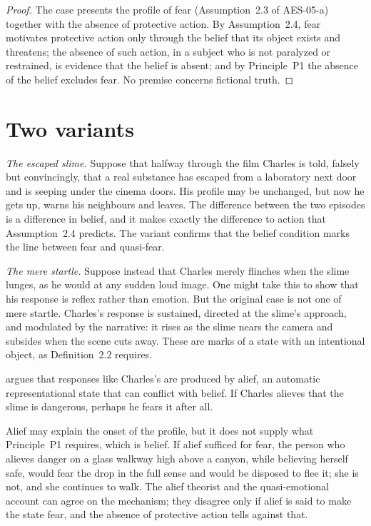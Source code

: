 \documentclass{situationist-preprint}
\begin{document}
\begin{proof}
The case presents the profile of fear (Assumption~2.3 of AES-05-a) together with the absence of protective action. By Assumption~2.4, fear motivates protective action only through the belief that its object exists and threatens; the absence of such action, in a subject who is not paralyzed or restrained, is evidence that the belief is absent; and by Principle~P1 the absence of the belief excludes fear. No premise concerns fictional truth.
\end{proof}

\section{Two variants}

\emph{The escaped slime.} Suppose that halfway through the film Charles is told, falsely but convincingly, that a real substance has escaped from a laboratory next door and is seeping under the cinema doors. His profile may be unchanged, but now he gets up, warns his neighbours and leaves. The difference between the two episodes is a difference in belief, and it makes exactly the difference to action that Assumption~2.4 predicts. The variant confirms that the belief condition marks the line between fear and quasi-fear.

\emph{The mere startle.} Suppose instead that Charles merely flinches when the slime lunges, as he would at any sudden loud image. One might take this to show that his response is reflex rather than emotion. But the original case is not one of mere startle. Charles's response is sustained, directed at the slime's approach, and modulated by the narrative: it rises as the slime nears the camera and subsides when the scene cuts away. These are marks of a state with an intentional object, as Definition~2.2 requires.

\begin{objection}[Alief]
\citet{Gendler2008} argues that responses like Charles's are produced by alief, an automatic representational state that can conflict with belief. If Charles alieves that the slime is dangerous, perhaps he fears it after all.
\end{objection}

\begin{reply}
Alief may explain the onset of the profile, but it does not supply what Principle~P1 requires, which is belief. If alief sufficed for fear, the person who alieves danger on a glass walkway high above a canyon, while believing herself safe, would fear the drop in the full sense and would be disposed to flee it; she is not, and she continues to walk. The alief theorist and the quasi-emotional account can agree on the mechanism; they disagree only if alief is said to make the state fear, and the absence of protective action tells against that.
\end{reply}
\end{document}
